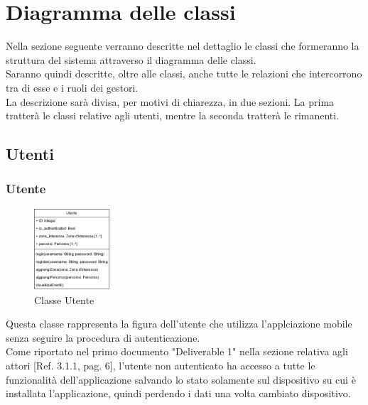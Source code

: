 \documentclass{article}
\begin{document}
\clearpage

\section{Diagramma delle classi}

Nella sezione seguente verranno descritte nel dettaglio le classi che formeranno la struttura del sistema attraverso il diagramma delle classi.\\
Saranno quindi descritte, oltre alle classi, anche tutte le relazioni che intercorrono tra di esse e i ruoli dei gestori.\\

La descrizione sarà divisa, per motivi di chiarezza, in due sezioni. La prima tratterà le classi relative agli utenti, mentre la seconda tratterà le rimanenti.\\

\subsection{Utenti}

\subsubsection{Utente}

\begin{figure}[htbp]
    \centering
    \includegraphics[width=0.25\textwidth]{Images/utente_class.png}
    \caption{Classe Utente}
    \label{fig:utente}
\end{figure}

Questa classe rappresenta la figura dell'utente che utilizza l'applciazione mobile senza seguire la procedura di autenticazione.\\
Come riportato nel primo documento "Deliverable 1" nella sezione relativa agli attori [Ref. 3.1.1, pag. 6], l'utente non autenticato ha accesso a tutte le funzionalità dell'applicazione salvando lo stato solamente sul dispositivo su cui è installata l'applicazione, quindi perdendo i dati una volta cambiato dispositivo.\\
\end{document}
